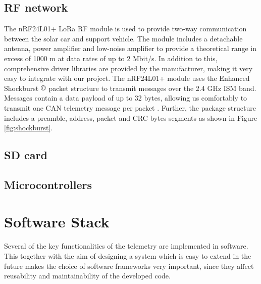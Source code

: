 \documentclass[conference]{IEEEtran}
\begin{document}
\subsection{RF network} %
The nRF24L01+ LoRa RF module is used to provide two-way communication between the solar car and support vehicle. The module includes a detachable antenna, power amplifier and low-noise amplifier to provide a theoretical range in excess of 1000 m at data rates of up to 2 Mbit/s. In addition to this, comprehensive driver libraries are provided by the manufacturer, making it very easy to integrate with our project.
The nRF24L01+ module uses the Enhanced Shockburst $\copyright$ packet structure to transmit messages over the 2.4 GHz ISM band. Messages contain a data payload of up to 32 bytes, allowing us comfortably to transmit one CAN telemetry message per packet \cite{shockburst}. Further, the package structure includes a preamble, address, packet and CRC bytes segments as shown in Figure \ref{fig:shockburst}. 

\subsection{SD card}
\subsection{Microcontrollers} %

\section{Software Stack}

Several of the key functionalities of the telemetry are implemented in software. This together with the aim of designing a system which is easy to extend in the future makes the choice of software frameworks very important, since they affect reusability and maintainability of the developed code.
\end{document}
